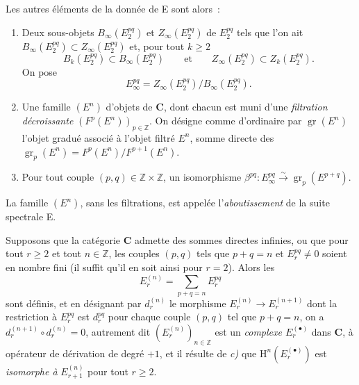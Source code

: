 \begin{env}[11.1.1]
Les autres éléments de la donnée de E sont alors~:
\begin{enumerate}
  \item[$d)$] Deux sous-objets $B_\infty(E_2^{pq})$ et
    $Z_\infty(E_2^{pq})$ de $E_2^{pq}$ tels que l'on ait
    $B_\infty(E_2^{pq})\subset Z_\infty(E_2^{pq})$ et, pour tout $k\geq2$
    \[
      B_k(E_2^{pq})\subset B_\infty(E_2^{pq})
      \qquad\text{et}\qquad
      Z_\infty(E_2^{pq})\subset Z_k(E_2^{pq}).
    \]
    On pose
    \[
    \label{0.11.1.1.3-fr}
      E_\infty^{pq}=Z_\infty(E_2^{pq})/B_\infty(E_2^{pq}).
      \tag{11.1.1.3}
    \]
  \item[$e)$]
    Une famille $(E^n)$ d'objets de $\boldsymbol{C}$, dont chacun est muni d'une
    \emph{filtration décroissante} $(F^p(E^n))_{p\in\mathbb Z}$. On désigne
    comme d'ordinaire par $\operatorname{gr}(E^n)$ l'objet gradué associé à
    l'objet filtré $E^n$, somme directe des
    $\operatorname{gr}_p(E^n)=F^p(E^n)/F^{p+1}(E^n)$.
  \item[$f)$] Pour tout couple $(p,q)\in\mathbb Z\times\mathbb Z$, un
    isomorphisme
    $\beta^{pq}:E_\infty^{pq}\xrightarrow{\sim}
    \operatorname{gr}_p(E^{p+q})$.
\end{enumerate}

La famille $(E^n)$, sans les filtrations, est appelée l'\emph{aboutissement}
de la suite spectrale E.

Supposons que la catégorie $\boldsymbol{C}$ admette des sommes directes infinies,
ou que pour tout $r\geq2$ et tout $n\in\mathbb Z$, les couples $(p,q)$ tels
que $p+q=n$ et $E_r^{pq}\ne0$ soient en nombre fini (il suffit qu'il en soit
ainsi pour $r=2$). Alors les
\[
  E_r^{(n)}=\sum_{p+q=n}E_r^{pq}
\]
sont définis, et en désignant par $d_r^{(n)}$ le morphisme
$E_r^{(n)}\to E_r^{(n+1)}$ dont la restriction à $E_r^{pq}$ est $d_r^{pq}$
pour chaque couple $(p,q)$ tel que $p+q=n$, on a
$d_r^{(n+1)}\circ d_r^{(n)}=0$, autrement dit $(E_r^{(n)})_{n\in\mathbb Z}$
est un \emph{complexe $E_r^{(\bullet)}$} dans $\boldsymbol{C}$, à opérateur de
dérivation de degré $+1$, et il résulte de \emph{c)} que
$\mathrm H^n(E_r^{(\bullet)})$ est \emph{isomorphe à} $E_{r+1}^{(n)}$ pour tout
$r\geq2$.
\end{env}

